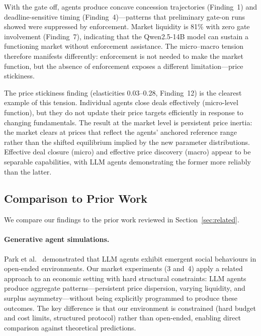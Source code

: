 With the gate off, agents produce concave concession trajectories (Finding~1) and deadline-sensitive timing (Finding~4)---patterns that preliminary gate-on runs showed were suppressed by enforcement.  Market liquidity is 81\% with zero gate involvement (Finding~7), indicating that the Qwen2.5-14B model can sustain a functioning market without enforcement assistance.  The micro--macro tension therefore manifests differently: enforcement is not needed to make the market function, but the absence of enforcement exposes a different limitation---price stickiness.

The price stickiness finding (elasticities 0.03--0.28, Finding~12) is the clearest example of this tension.  Individual agents close deals effectively (micro-level function), but they do not update their price targets efficiently in response to changing fundamentals.  The result at the market level is persistent price inertia: the market clears at prices that reflect the agents' anchored reference range rather than the shifted equilibrium implied by the new parameter distributions.  Effective deal closure (micro) and effective price discovery (macro) appear to be separable capabilities, with LLM agents demonstrating the former more reliably than the latter.

\subsection{Comparison to Prior Work}
\label{sec:disc-prior}

We compare our findings to the prior work reviewed in Section~\ref{sec:related}.

\paragraph{Generative agent simulations.}
Park et al.~\cite{park2023generative} demonstrated that LLM agents exhibit emergent social behaviours in open-ended environments.  Our market experiments (3 and~4) apply a related approach to an economic setting with hard structural constraints: LLM agents produce aggregate patterns---persistent price dispersion, varying liquidity, and surplus asymmetry---without being explicitly programmed to produce these outcomes.  The key difference is that our environment is constrained (hard budget and cost limits, structured protocol) rather than open-ended, enabling direct comparison against theoretical predictions.

